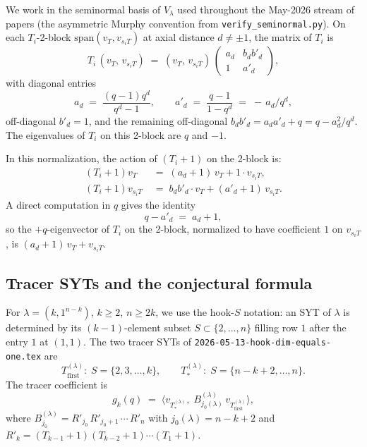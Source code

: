 \documentclass[11pt]{article}
\theoremstyle{definition}
\begin{document}
We work in the seminormal basis of $V_\lambda$ used throughout the
May-2026 stream of papers (the asymmetric Murphy convention from
\texttt{verify\_seminormal.py}).  On each $T_i$-2-block
$\mathrm{span}(v_T, v_{s_iT})$ at axial distance $d \ne \pm 1$, the
matrix of $T_i$ is
\begin{equation}\label{eq:hoefsmit}
   T_i\,(v_T,\,v_{s_iT}) \;=\;
   (v_T,\,v_{s_iT})\,
   \begin{pmatrix} a_d & b_d b'_d \\ 1 & a'_d \end{pmatrix},
\end{equation}
with diagonal entries
\[
   a_d \;=\; \frac{(q-1)q^d}{q^d - 1}, \qquad
   a'_d \;=\; \frac{q-1}{1 - q^d}\;=\; -\,a_d/q^d,
\]
off-diagonal $b'_d = 1$, and the remaining off-diagonal
$b_d b'_d = a_d a'_d + q = q - a_d^2 / q^d$.  The eigenvalues of $T_i$
on this 2-block are $q$ and $-1$.

In this normalization, the action of $(T_i + 1)$ on the 2-block is:
\begin{align*}
   (T_i + 1) v_T &\;=\; (a_d + 1)\,v_T + 1\cdot v_{s_iT}, \\
   (T_i + 1) v_{s_iT} &\;=\; b_d b'_d \cdot v_T + (a'_d + 1)\,v_{s_iT}.
\end{align*}
A direct computation in $q$ gives the identity
\begin{equation}\label{eq:eigvec}
   q - a'_d \;=\; a_d + 1,
\end{equation}
so the $+q$-eigenvector of $T_i$ on the 2-block, normalized to have
coefficient $1$ on $v_{s_iT}$, is $(a_d + 1)\, v_T + v_{s_iT}$.

\subsection{Tracer SYTs and the conjectural formula}

For $\lambda = (k, 1^{n-k})$, $k \ge 2$, $n \ge 2k$, we use the
hook-$S$ notation: an SYT of $\lambda$ is determined by its
$(k-1)$-element subset $S \subset \{2,\ldots,n\}$ filling row $1$ after
the entry $1$ at $(1,1)$.  The two tracer SYTs of
\texttt{2026-05-13-hook-dim-equals-one.tex} are
\[
   T_{\mathrm{first}}^{(\lambda)}: \; S = \{2, 3, \ldots, k\},
   \qquad
   T_{*}^{(\lambda)}: \; S = \{n - k + 2, \ldots, n\}.
\]
The tracer coefficient is
\[
   g_k(q) \;=\; \langle v_{T_{*}^{(\lambda)}},\;
   B^{(\lambda)}_{j_0(\lambda)}\, v_{T_{\mathrm{first}}^{(\lambda)}}\rangle,
\]
where $B^{(\lambda)}_{j_0} = R'_{j_0}\,R'_{j_0+1}\,\cdots\,R'_n$ with
$j_0(\lambda) = n - k + 2$ and
$R'_k = (T_{k-1}+1)(T_{k-2}+1)\cdots(T_1+1)$.
\end{document}
